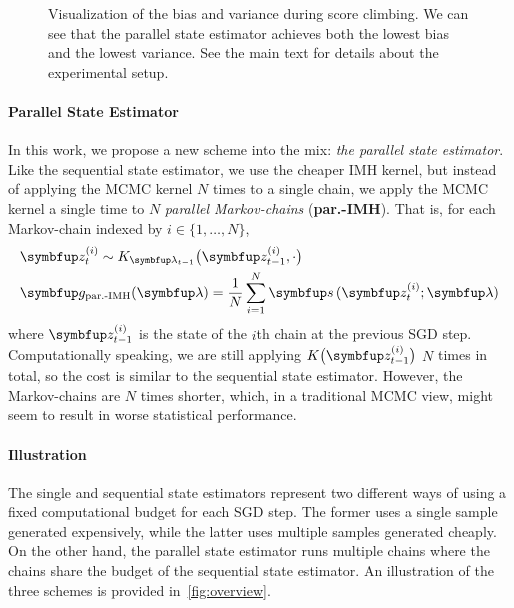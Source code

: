 \begin{figure}
    \vspace{-0.1in}
    \centering
    
    \vspace{-0.3in}
    \caption{Visualization of the bias and variance during score climbing.
      We can see that the parallel state estimator achieves both the lowest bias and the lowest variance.
      See the main text for details about the experimental setup.
    }\label{fig:gaussian}
    \vspace{-0.15in}
\end{figure}

\vspace{-0.08in}
\paragraph{Parallel State Estimator}
In this work, we propose a new scheme into the mix: \textit{the parallel state estimator}.
Like the sequential state estimator, we use the cheaper IMH kernel, but instead of applying the MCMC kernel \(N\) times to a single chain, we apply the MCMC kernel a single time to \(N\) \textit{parallel Markov-chains} (\textbf{par.-IMH}).
That is, for each Markov-chain indexed by \(i \in \{1, \ldots, N\}\),
%
\vspace{-0.05in}
\begin{align*}
  &\vz_{t}^{(i)} \sim K_{\vlambda_{t-1}}\big(\vz_{t-1}^{(i)}, \cdot \big) \\
  &\vg_{\text{par.-IMH}}(\vlambda) = \frac{1}{N} \sum_{i=1}^N \vs\,(\vz_{t}^{(i)}; \vlambda)
\end{align*}
%
where \(\vz_{t-1}^{(i)}\) is the state of the \(i\)th chain at the previous SGD step.
Computationally speaking, we are still applying \(K\big(\vz_{t-1}^{(i)}\big)\) \(N\) times in total, so the cost is similar to the sequential state estimator.
However, the Markov-chains are \(N\) times shorter, which, in a traditional MCMC view, might seem to result in worse statistical performance.

\vspace{-0.08in}
\paragraph{Illustration}
The single and sequential state estimators represent two different ways of using a fixed computational budget for each SGD step.
The former uses a single sample generated expensively, while the latter uses multiple samples generated cheaply.
On the other hand, the parallel state estimator runs multiple chains where the chains share the budget of the sequential state estimator.
An illustration of the three schemes is provided in~\cref{fig:overview}.

